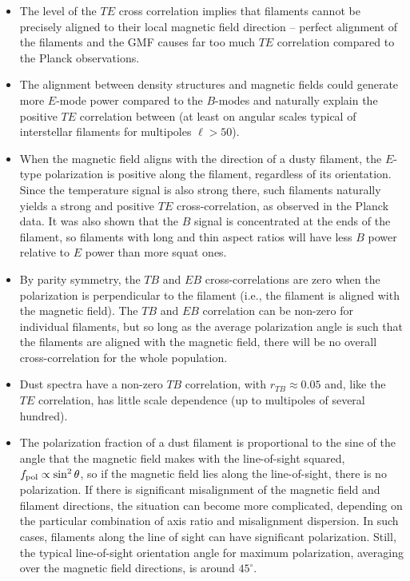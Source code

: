 \documentclass[a4paper,10pt]{article}
\begin{document}
\begin{itemize}
	\item The level of the $TE$ cross correlation implies that filaments cannot be precisely aligned to their local magnetic field direction -- perfect alignment of the filaments and the GMF causes far too much $TE$ correlation compared to the Planck observations.
	\item The alignment between density structures and magnetic fields could generate more $E$-mode power compared to the $B$-modes and naturally explain the positive $TE$ correlation between (at least on angular scales typical of interstellar filaments for multipoles $\ell>50$).
	\item When the magnetic field aligns with the direction of a dusty filament, the $E$-type polarization is positive along the filament, regardless of its orientation. Since the temperature signal is also strong there, such filaments naturally yields a strong and positive $TE$ cross-correlation, as observed in the Planck data. It was also shown that the $B$ signal is concentrated at the ends of the filament, so filaments with long and thin aspect ratios will have less $B$ power relative to $E$ power than more squat ones.
	\item By parity symmetry, the $TB$ and $EB$ cross-correlations are zero when the polarization is perpendicular to the filament (i.e., the filament is aligned with the magnetic field). The $TB$ and $EB$ correlation can be non-zero for individual filaments, but so long as the average polarization angle is such that the filaments are aligned with the magnetic field, there will be no overall cross-correlation for the whole population.
	\item Dust spectra have a non-zero $TB$ correlation, with $r_{TB}\approx0.05$ and, like the $TE$ correlation, has little scale dependence (up to multipoles of several hundred).
	\item The polarization fraction of a dust filament is proportional to the sine of the angle that the magnetic field makes with the line-of-sight squared, $f_{\rm pol}\propto\sin^2\theta$, so if the magnetic field lies along the line-of-sight, there is no polarization. If there is significant misalignment of the magnetic field and filament directions, the situation can become more complicated, depending on the particular combination of axis ratio and misalignment dispersion. In such cases, filaments along the line of sight can have significant polarization. Still, the typical line-of-sight orientation angle for maximum polarization, averaging over the magnetic field directions, is around $45^\circ$.

\end{itemize}
\end{document}
